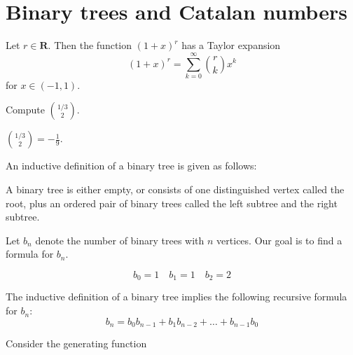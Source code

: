 \section{Binary trees and Catalan numbers}
\begin{theorem}
Let $r\in \mathbf{R}$. Then the function $(1+x)^{r}$ has a Taylor expansion
$$
(1+x)^{r}=\sum_{k=0}^{\infty} \binom{ r}  {k } x^{k}
$$
for $x \in (-1,1)$.
\end{theorem}

\begin{question}
Compute $\binom{1/3}  {2 }$.
\end{question}
\begin{answer}
$\binom{ 1/3}  {2 }=-\frac{1}{9}$.
\end{answer}

\begin{definition}
An inductive definition of a binary tree is given as follows:

A binary tree is either empty, or consists of one distinguished vertex called the root, plus an ordered pair of binary trees called the left subtree and the right subtree.
\end{definition}

Let $b_{n}$ denote the number of binary trees with $n$ vertices. Our goal is to find a formula for $b_{n}$.
\begin{example}
$$
b_{0}=1\quad b_{1}=1\quad b_{2}=2
$$
\end{example}

The inductive definition of a binary tree implies the following recursive formula for $b_{n}$:
$$
b_{n}=b_{0}b_{n-1}+b_{1}b_{n-2}+\dots +b_{n-1}b_{0}
$$

Consider the generating function

